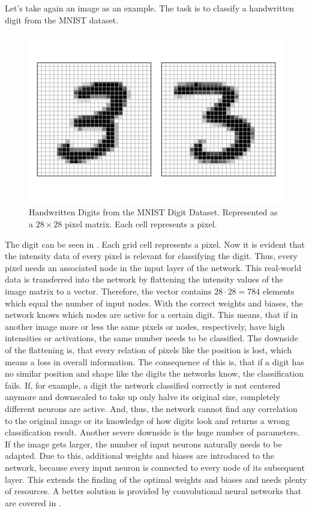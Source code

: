 Let's take again an image as an example.
The task is to classify a handwritten digit from the MNIST dataset\cite{Lecun98}.
\begin{figure}
	\centering
	\includegraphics[width=.8\textwidth]{images/mnist-digit}
	\caption[Handwritten Digits from the MNIST Digit Dataset]{Handwritten Digits from the MNIST Digit Dataset. Represented as a $28 \times 28$ pixel matrix. Each cell represents a pixel.}
	\label{fig:mnist-digit}
\end{figure}
The digit can be seen in .
Each grid cell represents a pixel.
Now it is evident that the intensity data of every pixel is relevant for classifying the digit.
Thus, every pixel needs an associated node in the input layer of the network.
This real-world data is transferred into the network by flattening the intensity values of the image matrix to a vector.
Therefore, the vector contains $28 \cdot 28 = 784$ elements which equal the number of input nodes.
With the correct weights and biases, the network knows which nodes are active for a certain digit.
This means, that if in another image more or less the same pixels or nodes, respectively, have high intensities or activations, the same number needs to be classified.
The downside of the flattening is, that every relation of pixels like the position is lost, which means a loss in overall information.
The consequence of this is, that if a digit has no similar position and shape like the digits the networks know, the classification fails.
If, for example, a digit the network classified correctly is not centered anymore and downscaled to take up only halve its original size, completely different neurons are active.
And, thus, the network cannot find any correlation to the original image or its knowledge of how digits look and returns a wrong classification result.
Another severe downside is the huge number of parameters.
If the image gets larger, the number of input neurons naturally needs to be adapted.
Due to this, additional weights and biases are introduced to the network, because every input neuron is connected to every node of its subsequent layer.
This extends the finding of the optimal weights and biases and needs plenty of resources.
A better solution is provided by convolutional neural networks that are covered in .
